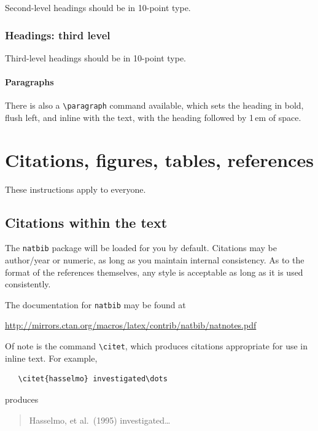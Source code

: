 \documentclass{article}
\begin{document}
Second-level headings should be in 10-point type.


\subsubsection{Headings: third level}


Third-level headings should be in 10-point type.


\paragraph{Paragraphs}


There is also a \verb+\paragraph+ command available, which sets the heading in
bold, flush left, and inline with the text, with the heading followed by 1\,em
of space.


\section{Citations, figures, tables, references}
\label{others}


These instructions apply to everyone.


\subsection{Citations within the text}


The \verb+natbib+ package will be loaded for you by default.  Citations may be
author/year or numeric, as long as you maintain internal consistency.  As to the
format of the references themselves, any style is acceptable as long as it is
used consistently.


The documentation for \verb+natbib+ may be found at
\begin{center}
  \url{http://mirrors.ctan.org/macros/latex/contrib/natbib/natnotes.pdf}
\end{center}
Of note is the command \verb+\citet+, which produces citations appropriate for
use in inline text.  For example,
\begin{verbatim}
   \citet{hasselmo} investigated\dots
\end{verbatim}
produces
\begin{quote}
  Hasselmo, et al.\ (1995) investigated\dots
\end{quote}
\end{document}
